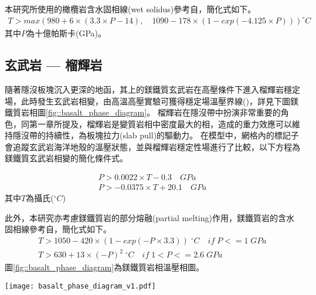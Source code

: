 本研究所使用的橄欖岩含水固相線(wet solidus)參考自\citealp{katz2003new}，簡化式如下。
\begin{align}
    T > max (980+6\times (3.3 \times P-14) ,\quad 1090-178\times(1-exp(-4.125\times P))) ^\circ C 
\end{align}
其中$P$為十億帕斯卡(GPa)。

\subsection{玄武岩 --- 榴輝岩}

隨著隱沒板塊沉入更深的地函，其上的鎂鐵質玄武岩在高壓條件下進入榴輝岩穩定場，此時發生玄武岩相變，由高溫高壓實驗可獲得穩定場溫壓界線(\citealp{Hacker2003})，詳見下圖鎂鐵質岩相圖\ref{fig::basalt_phase_diagram}。
榴輝岩在隱沒帶中扮演非常重要的角色，同第一章所提及，榴輝岩是變質岩相中密度最大的相，造成的重力效應可以維持隱沒帶的持續性，為板塊拉力(slab pull)的驅動力。
在模型中，網格內的標記子會追蹤玄武岩海洋地殼的溫壓狀態，並與榴輝岩穩定性場進行了比較，以下方程為鎂鐵質玄武岩相變的簡化條件式。

\begin{align}
    P > 0.0022 \times T -0.3  \quad GPa\\
    P > -0.0375 \times T + 20.1  \quad GPa
\end{align}
其中$T$為攝氏($^\circ C$)

此外，本研究亦考慮鎂鐵質岩的部分熔融(partial melting)作用，鎂鐵質岩的含水固相線參考自\citealp{Gutscher2000Bcan}，簡化式如下。
\begin{align}
    T > 1050-420 \times (1-exp(-P\times 3.3)) \; ^\circ C \quad if \; P <= 1 \; GPa\\
    T > 630 + 13 \times (-P)^2\; ^\circ C \quad if \; 1 < P <= 2.6 \;GPa 
\end{align}
圖\ref{fig::basalt_phase_diagram}為鎂鐵質岩相溫壓相圖。
\begin{figure*}[ht!]
    \centering
    \texttt{[image: basalt\_phase\_diagram\_v1.pdf]}
    \caption[鎂鐵質岩相圖，參考自\citealp{Hacker2003}與\citealp{Gutscher2000Bcan}]{鎂鐵質岩相圖，綠線隔開玄武岩與榴輝岩的穩定場，參考自\citealp{Hacker2003}，橘線為鎂鐵質岩的含水固相線，參考自\citealp{Gutscher2000Bcan}，綠虛線為外插值。}
    \label{fig::basalt_phase_diagram}
\end{figure*}

